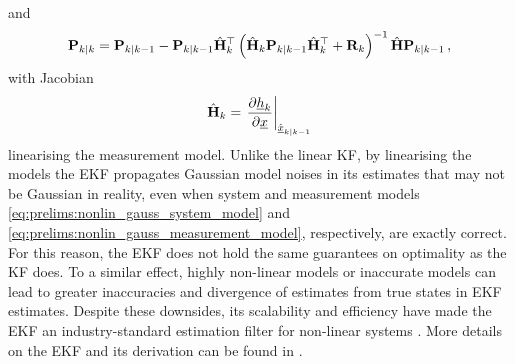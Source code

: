 and
\begin{equation}\label{eq:prelims:ekf_cov_update}
    {\ensuremath{{\mathbf{P}}}}_{k|k} = {{\mathbf{P}}}_{k|k-1}-{{\mathbf{P}}}_{k|k-1}\hat{{{\mathbf{H}}}}_k^\top\left(\hat{{{\mathbf{H}}}}_k{{\mathbf{P}}}_{k|k-1}\hat{{{\mathbf{H}}}}_k^\top + {{\mathbf{R}}}_k\right)^{-1}\hat{{{\mathbf{H}}}}{{\mathbf{P}}}_{k|k-1}\,,
\end{equation}
with Jacobian
\begin{equation}\label{eq:prelims:ekf_update_jacobian}
    \hat{{{\mathbf{H}}}}_k = \left.\frac{\partial {\underline{h}}_k}{\partial {\underline{x}}}\right|_{\hat{{\underline{x}}}_{k|k-1}}
\end{equation}
linearising the measurement model. Unlike the linear KF, by linearising the models the EKF propagates Gaussian model noises in its estimates that may not be Gaussian in reality, even when system and measurement models \eqref{eq:prelims:nonlin_gauss_system_model} and \eqref{eq:prelims:nonlin_gauss_measurement_model}, respectively, are exactly correct. For this reason, the EKF does not hold the same guarantees on optimality as the KF does. To a similar effect, highly non-linear models or inaccurate models can lead to greater inaccuracies and divergence of estimates from true states in EKF estimates. Despite these downsides, its scalability and efficiency have made the EKF an industry-standard estimation filter for non-linear systems \cite{theanalyticsciencescorporationAppliedOptimalEstimation1974,yangExtendedKalmanFilter2017,psiakiExtendedKalmanFilter2002}. More details on the EKF and its derivation can be found in \cite[Chap. 7]{haugBayesianEstimationTracking2012}.

% 
% 

